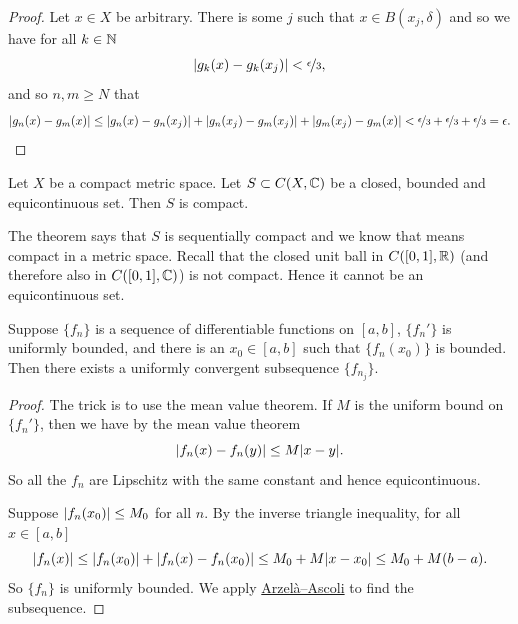 \begin{proof}
Let $x \in X$ be arbitrary.  There is some $j$ such that
$x \in B(x_j,\delta)$ and so we have for all $k \in {\mathbb{N}}$
\begin{equation*}
\lvert {g_k(x)-g_k(x_j)} \rvert < \nicefrac{\epsilon}{3},
\end{equation*}
and so $n,m \geq N$ that
\begin{equation*}
\lvert {g_n(x)-g_m(x)} \rvert \leq
\lvert {g_n(x)-g_n(x_j)} \rvert +
\lvert {g_n(x_j)-g_m(x_j)} \rvert +
\lvert {g_m(x_j)-g_m(x)} \rvert <
\nicefrac{\epsilon}{3} +
\nicefrac{\epsilon}{3} +
\nicefrac{\epsilon}{3} = \epsilon . \qedhere
\end{equation*}
\end{proof}

\begin{cor}
Let $X$ be a compact metric space.
Let $S \subset C(X,{\mathbb{C}})$ be a closed, bounded and equicontinuous set.
Then $S$ is compact.
\end{cor}

The theorem says that $S$
is sequentially compact and we know that means
compact in a metric space.
Recall that the closed unit ball in $C([0,1],{\mathbb{R}})$ (and therefore also in
$C([0,1],{\mathbb{C}})$) is not compact.
Hence it cannot be an equicontinuous set.

\begin{cor}
Suppose $\{ f_n \}$ is a sequence of differentiable functions on $[a,b]$,
$\{ f_n' \}$ is uniformly bounded, and there is an
$x_0 \in [a,b]$ such that $\{ f_n(x_0) \}$ is bounded.
Then there exists a uniformly convergent
subsequence $\{ f_{n_j} \}$.
\end{cor}

\begin{proof}
The trick is to use the mean value theorem.  If $M$ is the uniform bound on
$\{ f_n' \}$, then we have by the mean value theorem
\begin{equation*}
\lvert {f_n(x)-f_n(y)} \rvert \leq M \lvert {x-y} \rvert .
\end{equation*}
So all the $f_n$ are Lipschitz with the same constant and hence
equicontinuous.

Suppose $\lvert {f_n(x_0)} \rvert \leq M_0$ for all $n$.
By the inverse triangle inequality, for all $x \in [a,b]$
\begin{equation*}
\lvert {f_n(x)} \rvert \leq \lvert {f_n(x_0)} \rvert+ \lvert {f_n(x)-f_n(x_0)} \rvert \leq M_0+ M \lvert {x-x_0} \rvert
\leq M_0 + M(b-a) .
\end{equation*}
So $\{ f_n \}$ is uniformly bounded.
We apply \hyperref[thm:arzelaascoli]{Arzel\`a--Ascoli} to find the subsequence.
\end{proof}

